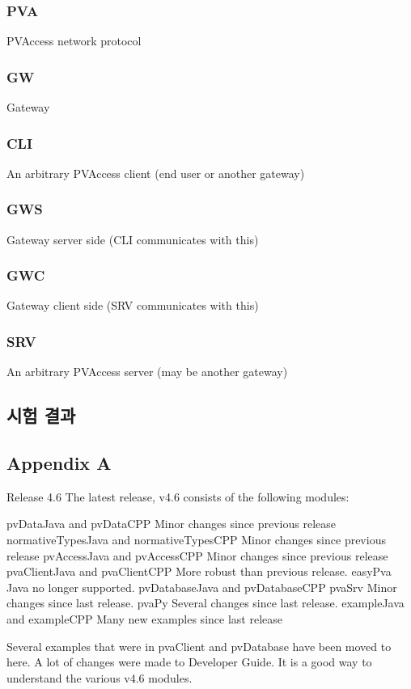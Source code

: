 \documentclass[11pt
  , a4paper
  , article
  , oneside
]{memoir}
\begin{document}
\subsubsection{PVA}
PVAccess network protocol

\subsubsection{GW}
Gateway

\subsubsection{CLI}
An arbitrary PVAccess client (end user or another gateway)

\subsubsection{GWS}
Gateway server side (CLI communicates with this)

\subsubsection{GWC}
Gateway client side (SRV communicates with this)

\subsubsection{SRV}
An arbitrary PVAccess server (may be another gateway)



\subsection{시험 결과}





\subsection{Appendix A}
Release 4.6
The latest release, v4.6 consists of the following modules:

pvDataJava and pvDataCPP
Minor changes since previous release
normativeTypesJava and normativeTypesCPP
Minor changes since previous release
pvAccessJava and pvAccessCPP
Minor changes since previous release
pvaClientJava and pvaClientCPP
More robust than previous release.
easyPva Java no longer supported.
pvDatabaseJava and pvDatabaseCPP
pvaSrv
Minor changes since last release.
pvaPy
Several changes since last release.
exampleJava and exampleCPP
Many new examples since last release

Several examples that were in pvaClient and pvDatabase have been moved to here.
A lot of changes were made to Developer Guide. It is a good way to understand the various v4.6 modules.












\clearpage


\end{document}
